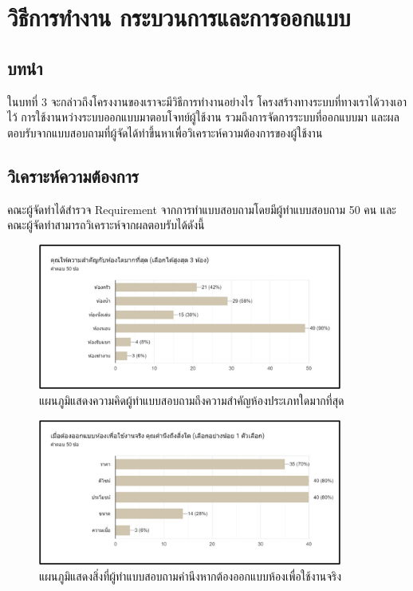 \documentclass[12pt,oneside,openright,a4paper]{cpe-thai-project}
\begin{document}
\chapter{วิธีการทำงาน กระบวนการและการออกแบบ}

\section{บทนำ}
\hspace {18pt} ในบทที่ 3 จะกล่าวถึงโครงงานของเราจะมีวิธีการทำงานอย่างไร โครงสร้างทางระบบที่ทางเราได้วางเอาไว้ การใช้งานหว่างระบบออกแบบมาตอบโจทย์ผู้ใช้งาน รวมถึงการจัดการระบบที่ออกแบบมา และผลตอบรับจากแบบสอบถามที่ผู้จัดได้ทำขึ้นหาเพื่อวิเคราะห์ความต้องการของผู้ใช้งาน

\section{วิเคราะห์ความต้องการ}
\hspace {18pt} คณะผู้จัดทำได้สำรวจ Requirement จากการทำแบบสอบถามโดยมีผู้ทำแบบสอบถาม 50 คน และคณะผู้จัดทำสามารถวิเคราะห์จากผลตอบรับได้ดังนี้

\begin{figure}[!h]\centering
\includegraphics[width=10cm]{image/requirement.jpg}
\caption{แผนภูมิแสดงความคิดผู้ทำแบบสอบถามถึงความสำคัญห้องประเภทใดมากที่สุด}
\label{fig:requirement}
\end{figure}

\begin{figure}[!h]\centering
\includegraphics[width=10cm]{image/requirement-2.jpg}
\caption{แผนภูมิแสดงสิ่งที่ผู้ทำแบบสอบถามคำนึงหากต้องออกแบบห้องเพื่อใช้งานจริง}
\label{fig:requirement-2}
\end{figure}
\end{document}
